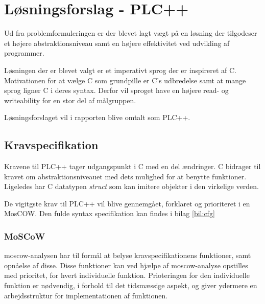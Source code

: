 \section{Løsningsforslag - PLC++}
Ud fra problemformuleringen er der blevet lagt vægt på en løsning der tilgodeser et højere abstraktionsniveau samt en højere effektivitet ved udvikling af programmer.

Løsningen der er blevet valgt er et imperativt sprog der er inspireret af C. Motivationen for at vælge C som grundpille er C's udbredelse samt at mange sprog ligner C i deres syntax. Derfor vil sproget have en højere read- og writeability for en stor del af målgruppen.

Løsningsforslaget vil i rapporten blive omtalt som PLC++.

\subsection{Kravspecifikation}
Kravene til PLC++ tager udgangspunkt i C med en del ændringer. C bidrager til kravet om abstraktionsniveauet med dets mulighed for at benytte funktioner. Ligeledes har C datatypen \textit{struct} som kan imitere objekter i den virkelige verden.

De vigitgste krav til PLC++ vil blive gennemgået, forklaret og prioriteret i en MosCOW. Den fulde syntax specifikation kan findes i bilag \ref{bil:cfg}

\subsubsection{MoSCoW}
\gls{moscow}-analysen har til formål at belyse kravspecifikationens funktioner, samt opnåelse af disse.
Disse funktioner kan ved hjælpe af \gls{moscow}-analyse opstilles med prioritet, for hvert individuelle funktion.
Prioteringen for den individuelle funktion er nødvendig, i forhold til det tidsmæssige aspekt, og giver ydermere en arbejdsstruktur for implementationen af funktionen.


